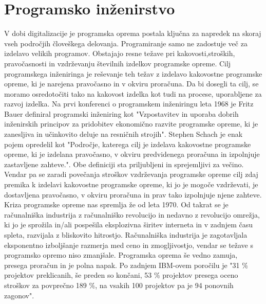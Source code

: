 \documentclass[a4paper,12pt,openright]{book}
\begin{document}
\section{Programsko inženirstvo}
V dobi digitalizacije je programska oprema postala ključna za napredek na skoraj vseh področjih človeškega delovanja. Programiranje samo ne zadostuje več za izdelavo velikih programov. Obstajajo resne težave pri kakovosti,stroških, pravočasnosti in vzdrževanju številnih izdelkov programske opreme.
Cilj programskega inženiringa je reševanje teh težav z izdelavo kakovostne programske opreme, ki je narejena pravočasno in v okviru proračuna. Da bi dosegli ta cilj, se moramo osredotočiti tako na kakovost izdelka kot tudi na procese, uporabljene za razvoj izdelka.
Na prvi konferenci o programskem inženiringu leta 1968 je Fritz Bauer definiral programski inženiring kot "Vzpostavitev in uporaba dobrih inženirskih principov za pridobitev ekonomično razvite programske opreme, ki je zanesljiva in učinkovito deluje na resničnih strojih". Stephen Schach je enak pojem opredelil kot "Področje, katerega cilj je izdelava kakovostne programske opreme, ki je izdelana pravočasno, v okviru predvidenega proračuna in izpolnjuje zastavljene zahteve.". Obe definiciji sta priljubljeni in sprejemljivi za večino. Vendar pa se zaradi povečanja stroškov vzdrževanja programske opreme cilj zdaj premika k izdelavi kakovostne programske opreme, ki jo je mogoče vzdrževati, je dostavljena pravočasno, v okviru proračuna in prav tako izpolnjuje njene zahteve.
Kriza programske opreme nas spremlja že od leta 1970. Od takrat se je računalniška industrija z računalniško revolucijo in nedavno z revolucijo omrežja, ki jo je sprožila in/ali pospešila eksplozivna širitev interneta in v zadnjem času spleta, razvijala z bliskovito hitrostjo.
Računalniška industrija je zagotavljala eksponentno izboljšanje razmerja med ceno in zmogljivostjo, vendar se težave s programsko opremo niso zmanjšale. Programska oprema še vedno zamuja, presega proračun in je polna napak. Po zadnjem IBM-ovem poročilu je "31 \% projektov preklicanih, še preden so končani, 53 \% projektov presega oceno stroškov za povprečno 189 \%, na vsakih 100 projektov pa je 94 ponovnih zagonov".
\end{document}

